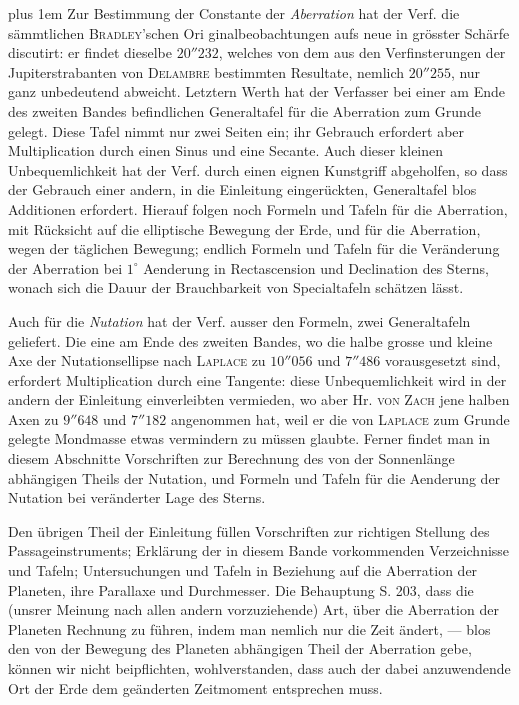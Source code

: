 \begingroup\rightskip=0pt plus 1em
Zur Bestimmung der Constante der \emph{Aberration} hat der Verf. die sämmtlichen \textsc{Bradley}'schen Ori%
%
ginalbeobachtungen aufs neue in grösster Schärfe discutirt: er findet dieselbe $20''232$, welches von dem aus den Verfinsterungen der Jupiterstrabanten von \textsc{Delambre} bestimmten Resultate, nemlich $20''255$, nur ganz unbedeutend abweicht. Letztern Werth hat der Verfasser bei einer am Ende des zweiten Bandes befindlichen Generaltafel für die Aberration zum Grunde gelegt. Diese Tafel nimmt nur zwei Seiten ein; ihr Gebrauch erfordert aber Multiplication durch einen Sinus und eine Secante. Auch dieser kleinen Unbequemlichkeit hat der Verf. durch einen eignen Kunstgriff abgeholfen, so dass der Gebrauch einer andern, in die Einleitung eingerückten, Generaltafel blos Additionen erfordert. Hierauf folgen noch Formeln und Tafeln für die Aberration, mit Rücksicht auf die elliptische Bewegung der Erde, und für die Aberration, wegen der täglichen Bewegung; endlich Formeln und Tafeln für die Veränderung der Aberration bei $1^\circ$ Aenderung in Rectascension und Declination des Sterns, wonach sich die Dauur der Brauchbarkeit von Specialtafeln schätzen lässt.\par\endgroup

Auch für die \emph{Nutation} hat der Verf. ausser den Formeln, zwei Generaltafeln geliefert. Die eine am Ende des zweiten Bandes, wo die halbe grosse und kleine Axe der Nutationsellipse nach \textsc{Laplace} zu $10''056$ und $7''486$ vorausgesetzt sind, erfordert Multiplication durch eine Tangente: diese Unbequemlichkeit wird in der andern der Einleitung einverleibten vermieden, wo aber Hr. \textsc{von Zach} jene halben Axen zu $9''648$ und $7''182$ angenommen hat, weil er die von \textsc{Laplace} zum Grunde gelegte Mondmasse etwas vermindern zu müssen glaubte. Ferner findet man in diesem Abschnitte Vorschriften zur Berechnung des von der Sonnenlänge abhängigen Theils der Nutation, und Formeln und Tafeln für die Aenderung der Nutation bei veränderter Lage des Sterns.

Den übrigen Theil der Einleitung füllen Vorschriften zur richtigen Stellung des Passageinstruments; Erklärung der in diesem Bande vorkommenden Verzeichnisse und Tafeln; Untersuchungen und Tafeln in Beziehung auf die Aberration der Planeten, ihre Parallaxe und Durchmesser. Die Behauptung S. 203, dass die (unsrer Meinung nach allen andern vorzuziehende) Art, über die Aberration der Planeten Rechnung zu führen, indem man nemlich nur die Zeit ändert, --- blos den von der Bewegung des Planeten abhängigen Theil der Aberration gebe, können wir nicht beipflichten, wohlverstanden, dass auch der dabei anzuwendende Ort der Erde dem geänderten Zeitmoment entsprechen muss.

